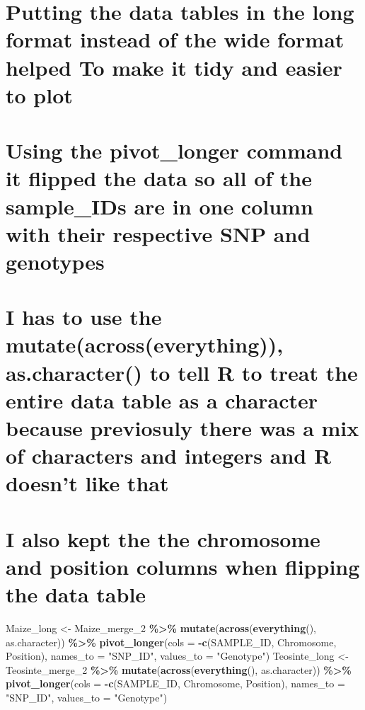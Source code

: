 \documentclass[
]{article}
\newenvironment{Shaded}{\begin{snugshade}}{\end{snugshade}}
\newcommand{\AttributeTok}[1]{\textcolor[rgb]{0.13,0.29,0.53}{#1}}
\newcommand{\FunctionTok}[1]{\textcolor[rgb]{0.13,0.29,0.53}{\textbf{#1}}}
\newcommand{\NormalTok}[1]{#1}
\newcommand{\OtherTok}[1]{\textcolor[rgb]{0.56,0.35,0.01}{#1}}
\newcommand{\SpecialCharTok}[1]{\textcolor[rgb]{0.81,0.36,0.00}{\textbf{#1}}}
\newcommand{\StringTok}[1]{\textcolor[rgb]{0.31,0.60,0.02}{#1}}
\begin{document}
\section{Putting the data tables in the long format instead of the wide
format helped To make it tidy and easier to
plot}\label{putting-the-data-tables-in-the-long-format-instead-of-the-wide-format-helped-to-make-it-tidy-and-easier-to-plot}

\section{Using the pivot\_longer command it flipped the data so all of
the sample\_IDs are in one column with their respective SNP and
genotypes}\label{using-the-pivot_longer-command-it-flipped-the-data-so-all-of-the-sample_ids-are-in-one-column-with-their-respective-snp-and-genotypes}

\section{I has to use the mutate(across(everything)), as.character() to
tell R to treat the entire data table as a character because previosuly
there was a mix of characters and integers and R doesn't like
that}\label{i-has-to-use-the-mutateacrosseverything-as.character-to-tell-r-to-treat-the-entire-data-table-as-a-character-because-previosuly-there-was-a-mix-of-characters-and-integers-and-r-doesnt-like-that}

\section{I also kept the the chromosome and position columns when
flipping the data
table}\label{i-also-kept-the-the-chromosome-and-position-columns-when-flipping-the-data-table}

\begin{Shaded}
\begin{Highlighting}[]
\NormalTok{Maize\_long }\OtherTok{\textless{}{-}}\NormalTok{ Maize\_merge\_2 }\SpecialCharTok{\%\textgreater{}\%} \FunctionTok{mutate}\NormalTok{(}\FunctionTok{across}\NormalTok{(}\FunctionTok{everything}\NormalTok{(), as.character)) }\SpecialCharTok{\%\textgreater{}\%} 
  \FunctionTok{pivot\_longer}\NormalTok{(}\AttributeTok{cols =} \SpecialCharTok{{-}}\FunctionTok{c}\NormalTok{(SAMPLE\_ID, Chromosome, Position), }\AttributeTok{names\_to =} \StringTok{"SNP\_ID"}\NormalTok{, }\AttributeTok{values\_to =} \StringTok{"Genotype"}\NormalTok{)}
\NormalTok{Teosinte\_long }\OtherTok{\textless{}{-}}\NormalTok{ Teosinte\_merge\_2 }\SpecialCharTok{\%\textgreater{}\%} \FunctionTok{mutate}\NormalTok{(}\FunctionTok{across}\NormalTok{(}\FunctionTok{everything}\NormalTok{(), as.character)) }\SpecialCharTok{\%\textgreater{}\%} 
  \FunctionTok{pivot\_longer}\NormalTok{(}\AttributeTok{cols =} \SpecialCharTok{{-}}\FunctionTok{c}\NormalTok{(SAMPLE\_ID, Chromosome, Position), }\AttributeTok{names\_to =} \StringTok{"SNP\_ID"}\NormalTok{, }\AttributeTok{values\_to =} \StringTok{"Genotype"}\NormalTok{)}
\end{Highlighting}
\end{Shaded}
\end{document}
